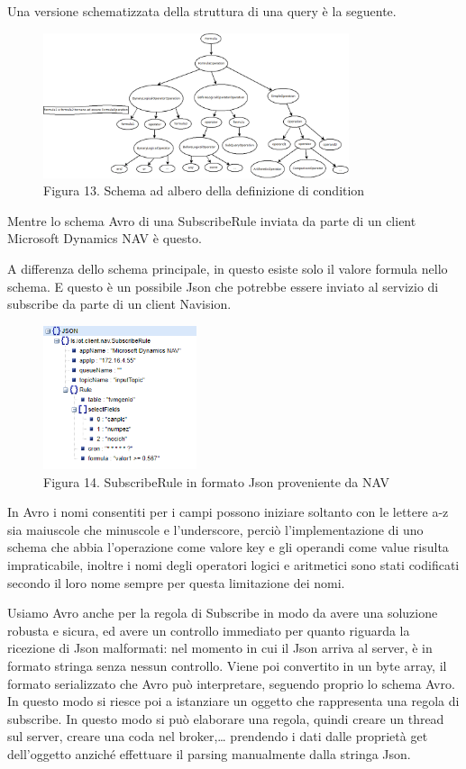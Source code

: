 \par
Una versione schematizzata della struttura di una query è la seguente.
\begin{figure}[h]
	\centering
	\includegraphics[width=0.8\textwidth]{struttura-query-tree.png}
	\caption*{Figura 13. Schema ad albero della definizione di condition}
\end{figure}
\clearpage
Mentre lo schema Avro di una SubscribeRule inviata da parte di un client Microsoft Dynamics NAV è questo.
\begin{center}
		{\selectfont
			
		}
\end{center}
A differenza dello schema principale, in questo esiste solo il valore formula nello schema. E questo è un possibile Json che potrebbe essere inviato al servizio di subscribe da parte di un client Navision.
\begin{figure}[h]
	\centering
	\includegraphics[width=0.4\textwidth]{subscribe-json-2.png}
	\caption*{Figura 14. SubscribeRule in formato Json proveniente da NAV}
\end{figure}
\par
In Avro i nomi consentiti per i campi possono iniziare soltanto con le lettere a-z sia maiuscole che minuscole e l’underscore, perciò l’implementazione di uno schema che abbia l’operazione come valore key e gli operandi come value risulta impraticabile, inoltre i nomi degli operatori logici e aritmetici sono stati codificati secondo il loro nome sempre per questa limitazione dei nomi.
\par
Usiamo Avro anche per la regola di Subscribe in modo da avere una soluzione robusta e sicura, ed avere un controllo immediato per quanto riguarda la ricezione di Json malformati: nel momento in cui il Json arriva al server, è in formato stringa senza nessun controllo. Viene poi convertito in un byte array, il formato serializzato che Avro può interpretare, seguendo proprio lo schema Avro. In questo modo si riesce poi a istanziare un oggetto che rappresenta una regola di subscribe. In questo modo si può elaborare una regola, quindi creare un thread sul server, creare una coda nel broker,… prendendo i dati dalle proprietà get dell’oggetto anziché effettuare il parsing manualmente dalla stringa Json.

